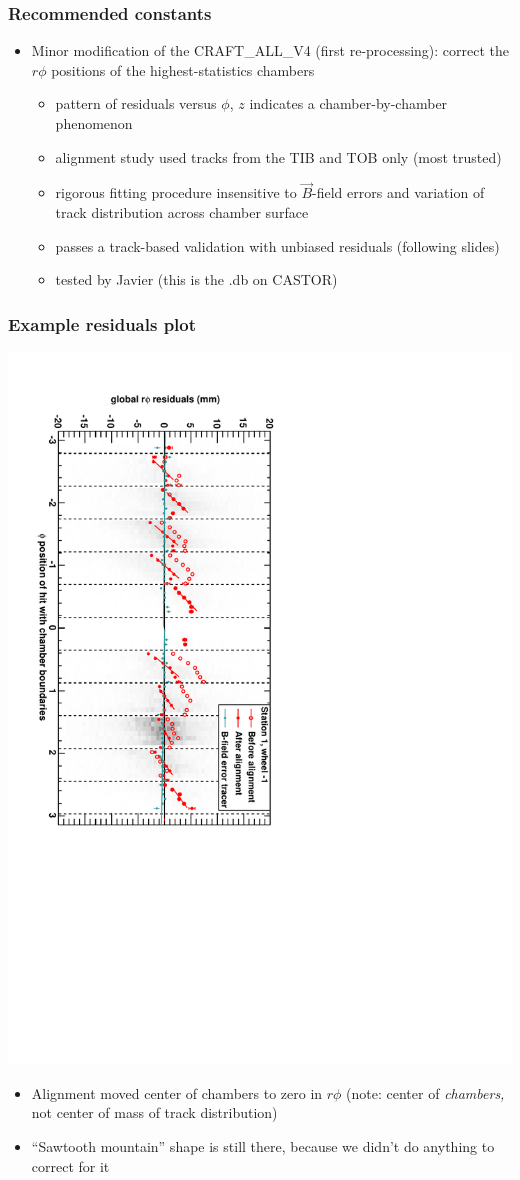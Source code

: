 \documentclass[compress]{beamer}
\begin{document}
\begin{frame}
\frametitle{Recommended constants}
\begin{itemize}\setlength{\itemsep}{0.25 cm}
\item Minor modification of the CRAFT\_ALL\_V4 (first re-processing):
  correct the $r\phi$ positions of the highest-statistics chambers
\begin{itemize}
\item pattern of residuals versus $\phi$, $z$ indicates a chamber-by-chamber phenomenon
\item alignment study used tracks from the TIB and TOB only (most trusted)
\item rigorous fitting procedure insensitive to $\vec{B}$-field errors
  and variation of track distribution across chamber surface
\item passes a track-based validation with unbiased residuals (following slides)
\item tested by Javier (this is the .db on CASTOR)
\end{itemize}

\end{itemize}
\end{frame}

\begin{frame}
\frametitle{Example residuals plot}

\includegraphics[height=\linewidth, angle=90]{DTrphiVsPhi_st1_whB.pdf}

\begin{itemize}
\item Alignment moved center of chambers to zero in $r\phi$ (note:
  center of {\it chambers,} not center of mass of track distribution)
\item ``Sawtooth mountain'' shape is still there, because we didn't do
  anything to correct for it
\end{itemize}
\end{frame}
\end{document}
